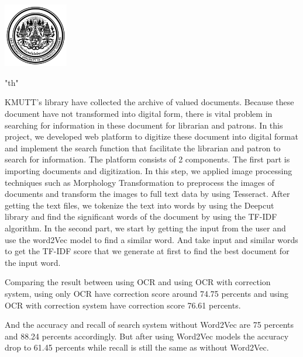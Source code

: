 \documentclass[12pt,oneside,openright,a4paper]{cpe-thai-project}
\begin{document}
\pdfstringdefDisableCommands{%
\let\MakeUppercase\relax
}
\begin{center}
\includegraphics[width=2.8cm]{logo02.jpg}
\end{center}
\vspace*{-1cm}
\maketitlepage
\makesignaturepage 
\XeTeXlinebreaklocale "th"	
\emergencystretch=10pt %
\abstract

KMUTT's library have collected the archive of valued documents. 
Because these document have not transformed into digital form, 
there is vital problem in searching for information in these 
document for librarian and patrons. In this project, we developed 
web platform to digitize these document into digital format 
and implement the search function that facilitate the librarian 
and patron to search for information. The platform consists of 
2 components. The first part is importing documents and 
digitization. In this step, we applied image processing 
techniques such as Morphology Transformation to preprocess
the images of documents and transform the images to full text 
data by using Tesseract. After getting the text files, we tokenize 
the text into words by using the Deepcut library and find the 
significant words of the document by using the TF-IDF algorithm. 
In the second part, we start by getting the input from the user 
and use the word2Vec model to find a similar word. And take 
input and similar words to get the TF-IDF score that we 
generate at first to find the best document for the input word.  

Comparing the result between using OCR and using OCR with correction system, 
using only OCR have correction score around 74.75 percents and using OCR with correction system
have correction score 76.61 percents.

And the accuracy and recall of search system without Word2Vec are 75 percents and 88.24 percents accordingly.
But after using Word2Vec models the accuracy drop to 61.45 percents while recall is still the same as without Word2Vec.
\end{document}
